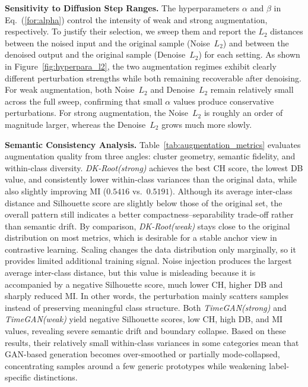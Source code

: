 \documentclass[lettersize,journal]{IEEEtran}
\begin{document}
{\color{R1color}
\noindent\textbf{Sensitivity to Diffusion Step Ranges.}
The hyperparameters $\alpha$ and $\beta$ in Eq.~(\ref{for:alpha}) control the intensity of weak and strong augmentation, respectively. To justify their selection, we sweep them and report the $L_2$ distances between the noised input and the original sample (Noise~$L_2$) and between the denoised output and the original sample (Denoise~$L_2$) for each setting.
As shown in Figure~\ref{fig:hyperpara_l2}, the two augmentation regimes exhibit clearly different perturbation strengths while both remaining recoverable after denoising. For weak augmentation, both Noise~$L_2$ and Denoise~$L_2$ remain relatively small across the full sweep, confirming that small $\alpha$ values produce conservative perturbations. For strong augmentation, the Noise~$L_2$ is roughly an order of magnitude larger, whereas the Denoise~$L_2$ grows much more slowly. 

{\color{R2color}
\noindent\textbf{Semantic Consistency Analysis.}
Table~\ref{tab:augmentation_metrics} evaluates augmentation quality from three angles: cluster geometry, semantic fidelity, and within-class diversity. \textit{DK-Root(strong)} achieves the best CH score, the lowest DB value, and consistently lower within-class variances than the original data, while also slightly improving MI ($0.5416$ vs.~$0.5191$). Although its average inter-class distance and Silhouette score are slightly below those of the original set, the overall pattern still indicates a better compactness--separability trade-off rather than semantic drift. By comparison, \textit{DK-Root(weak)} stays close to the original distribution on most metrics, which is desirable for a stable anchor view in contrastive learning.
Scaling changes the data distribution only marginally, so it provides limited additional training signal. Noise injection produces the largest average inter-class distance, but this value is misleading because it is accompanied by a negative Silhouette score, much lower CH, higher DB and sharply reduced MI. In other words, the perturbation mainly scatters samples instead of preserving meaningful class structure.
Both \textit{TimeGAN(strong)} and \textit{TimeGAN(weak)} yield negative Silhouette scores, low CH, high DB, and MI values, revealing severe semantic drift and boundary collapse. Based on these results, their relatively small within-class variances in some categories mean that GAN-based generation becomes over-smoothed or partially mode-collapsed, concentrating samples around a few generic prototypes while weakening label-specific distinctions. 

}}
\end{document}
